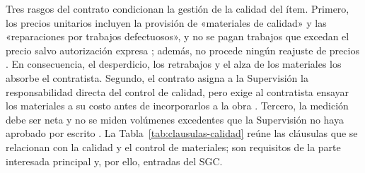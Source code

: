 Tres rasgos del contrato condicionan la gestión de la calidad del ítem. Primero, los precios unitarios incluyen la provisión de «materiales de calidad» y las «reparaciones por trabajos defectuosos», y no se pagan trabajos que excedan el precio salvo autorización expresa \parencite[p.~92]{uatf2025pao2}; además, no procede ningún reajuste de precios \parencite[p.~95]{uatf2025pao2}. En consecuencia, el desperdicio, los retrabajos y el alza de los materiales los absorbe el contratista. Segundo, el contrato asigna a la Supervisión la responsabilidad directa del control de calidad, pero exige al contratista ensayar los materiales a su costo antes de incorporarlos a la obra \parencite[pp.~101--102]{uatf2025pao2}. Tercero, la medición debe ser neta y no se miden volúmenes excedentes que la Supervisión no haya aprobado por escrito \parencite[p.~99]{uatf2025pao2}. La Tabla~\ref{tab:clausulas-calidad} reúne las cláusulas que se relacionan con la calidad y el control de materiales; son requisitos de la parte interesada principal y, por ello, entradas del SGC.

